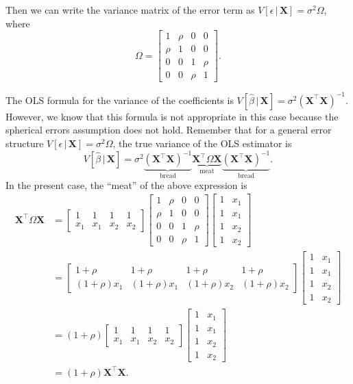 \documentclass[
  12pt,
  oneside,openany]{book}
\begin{document}
Then we can write the variance matrix of the error term as \(V[\epsilon \,|\, \mathbf{X}] = \sigma^2 \Omega\), where
\[
\Omega = \begin{bmatrix}
1 & \rho & 0 & 0 \\
\rho & 1 & 0 & 0 \\
0 & 0 & 1 & \rho \\
0 & 0 & \rho & 1
\end{bmatrix}.
\]

The OLS formula for the variance of the coefficients is \(V[\hat{\beta} \,|\, \mathbf{X}] = \sigma^2 (\mathbf{X}^\top \mathbf{X})^{-1}\).
However, we know that this formula is not appropriate in this case because the spherical errors assumption does not hold.
Remember that for a general error structure \(V[\epsilon \,|\, \mathbf{X}] = \sigma^2 \Omega\), the true variance of the OLS estimator is
\[
V[\hat{\beta} \,|\, \mathbf{X}]
= \sigma^2 \underbrace{(\mathbf{X}^\top \mathbf{X})^{-1}}_{\text{bread}} \underbrace{\mathbf{X}^\top \Omega \mathbf{X}}_{\text{meat}} \underbrace{(\mathbf{X}^\top \mathbf{X})^{-1}}_{\text{bread}}.
\]
In the present case, the ``meat'' of the above expression is
\[
\begin{aligned}
\mathbf{X}^\top \Omega \mathbf{X}
&= \begin{bmatrix}
1 & 1 & 1 & 1 \\
x_1 & x_1 & x_2 & x_2
\end{bmatrix}
\begin{bmatrix}
1 & \rho & 0 & 0 \\
\rho & 1 & 0 & 0 \\
0 & 0 & 1 & \rho \\
0 & 0 & \rho & 1
\end{bmatrix}
\begin{bmatrix}
1 & x_1 \\
1 & x_1 \\
1 & x_2 \\
1 & x_2
\end{bmatrix} \\
&= \begin{bmatrix}
1 + \rho & 1 + \rho & 1 + \rho & 1 + \rho \\
(1 + \rho) x_1 & (1 + \rho) x_1 & (1 + \rho) x_2 & (1 + \rho) x_2
\end{bmatrix}
\begin{bmatrix}
1 & x_1 \\
1 & x_1 \\
1 & x_2 \\
1 & x_2
\end{bmatrix} \\
&= (1 + \rho) \begin{bmatrix}
1 & 1 & 1 & 1 \\
x_1 & x_1 & x_2 & x_2
\end{bmatrix}
\begin{bmatrix}
1 & x_1 \\
1 & x_1 \\
1 & x_2 \\
1 & x_2
\end{bmatrix} \\
&= (1 + \rho) \mathbf{X}^\top \mathbf{X}.
\end{aligned}
\]
\end{document}
